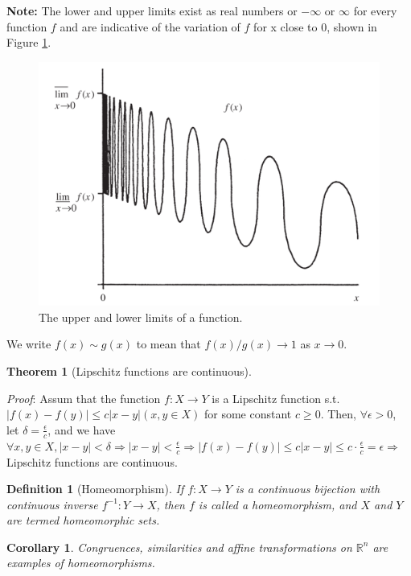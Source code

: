 \documentclass[12pt, a4paper]{article}
\newtheorem{definition}{Definition}[subsection]
\newtheorem{theorem}{Theorem}[subsection]
\newtheorem{corollary}{Corollary}[subsection]
\begin{document}
\textbf{Note:} The lower and upper limits exist as real numbers or $-\infty$ or $\infty$ for 
every function $f$ and are indicative of the variation of $f$ for x close to 0, shown in Figure \ref{fig:lowerupperlimit}.

\begin{figure}[H]
    \centering
    \includegraphics[width=.66\textwidth]{images/limit1.png}
    \caption{The upper and lower limits of a function.}
    \label{fig:lowerupperlimit}
\end{figure}

We write $f(x) \sim g(x)$ to mean that $f(x) / g(x) \rightarrow 1$ as $x \rightarrow 0$.

\begin{theorem}[Lipschitz functions are continuous]\label{LipschitzContinuous}
\end{theorem}

\textit{Proof}: Assum that the function $f: X \rightarrow Y$ is a Lipschitz function s.t. 
$|f(x)-f(y)| \leq c|x-y| (x, y \in X)$ for some constant $c\geq 0$.
Then, $\forall \epsilon > 0$, let $\displaystyle \delta = \frac{\epsilon}{c}$, and we have
$\forall x, y\in X, |x-y| < \delta \Rightarrow \displaystyle |x-y| < \frac{\epsilon}{c} \Rightarrow |f(x) - f(y)| \leq c |x-y| \leq c\cdot \frac{\epsilon}{c} = \epsilon \Rightarrow$ Lipschitz functions are continuous.

\begin{definition}[Homeomorphism]
    If $f: X \rightarrow Y$ is a continuous bijection with continuous 
    inverse $f^{-1}: Y \rightarrow X$, then $f$ is called a homeomorphism, 
    and $X$ and $Y$ are termed homeomorphic sets. 
\end{definition}
\begin{corollary}
    Congruences, similarities 
    and affine transformations on $\mathbb{R}^{n}$ are examples of homeomorphisms.
\end{corollary}
\end{document}
